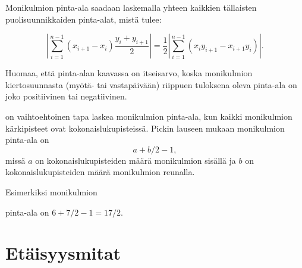 Monikulmion pinta-ala saadaan laskemalla yhteen kaikkien
tällaisten puolisuunnikkaiden pinta-alat, mistä tulee:

\[|\sum_{i=1}^{n-1} (x_{i+1}-x_{i}) \frac{y_i+y_{i+1}}{2}| =
\frac{1}{2} |\sum_{i=1}^{n-1} (x_i y_{i+1} - x_{i+1} y_i)|.\]

Huomaa, että pinta-alan kaavassa on itseisarvo,
koska monikulmion kiertosuunnasta (myötä- tai vastapäivään)
riippuen tuloksena oleva pinta-ala on joko
positiivinen tai negatiivinen.


 on vaihtoehtoinen tapa laskea
monikulmion pinta-ala,
kun kaikki monikulmion kärkipisteet
ovat kokonaislukupisteissä.
Pickin lauseen mukaan monikulmion pinta-ala on
\[ a + b/2 -1,\]
missä $a$ on kokonaislukupisteiden määrä monikulmion sisällä
ja $b$ on kokonaislukupisteiden määrä monikulmion reunalla.

Esimerkiksi monikulmion
\begin{center}
\end{center}

pinta-ala on $6+7/2-1=17/2$.

\section{Etäisyysmitat}


